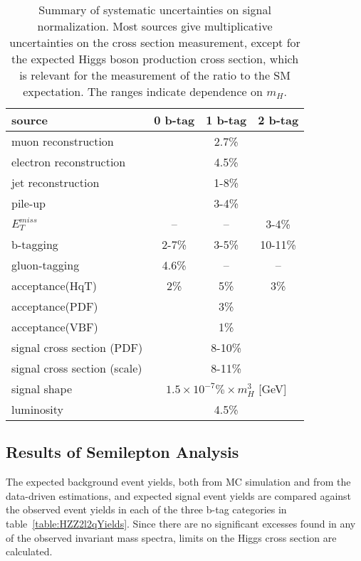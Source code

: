 \begin{table}
\begin{center}
\begin{tabular}{l|c|c|c}
\hline 
\hline

source & 0 b-tag & 1 b-tag & 2 b-tag \\ \hline \hline

muon reconstruction & \multicolumn{3}{c}{2.7\%} \\ \hline
electron reconstruction & \multicolumn{3}{c}{4.5\%} \\ \hline
jet reconstruction & \multicolumn{3}{c}{1-8\%} \\ \hline
pile-up & \multicolumn{3}{c}{3-4\%} \\ \hline
$E_T^{miss}$ & -- & -- & 3-4\% \\ \hline
b-tagging & 2-7\% & 3-5\% & 10-11\% \\ \hline
gluon-tagging & 4.6\% & -- & -- \\ \hline
acceptance(HqT) & 2\% & 5\% & 3\% \\ \hline
acceptance(PDF) & \multicolumn{3}{c}{3\%} \\ \hline
acceptance(VBF) & \multicolumn{3}{c}{1\%} \\ \hline
signal cross section (PDF) & \multicolumn{3}{c}{8-10\%} \\ \hline
signal cross section (scale) & \multicolumn{3}{c}{8-11\%} \\ \hline
signal shape    & \multicolumn{3}{c}{$1.5\times10^{-7}\%\times m_{H}^{3}$ [GeV]} \\ \hline
luminosity      & \multicolumn{3}{c}{4.5\%} \\ \hline \hline

\end{tabular}
\caption{Summary of systematic uncertainties on signal normalization.
Most sources give multiplicative uncertainties on the cross section
measurement, except for the expected Higgs boson production cross 
section, which is relevant for the measurement of the ratio to the 
SM expectation.  The ranges indicate dependence on $m_{H}$.}
\label{table:HZZ2l2qSystematics}
\end{center}
\end{table}

\subsection{Results of Semilepton Analysis}
\label{sec:HZZ2l2qxsec}

The expected background event yields, both from MC simulation and
from the data-driven estimations, and expected signal event yields
are compared against the observed event yields in each of the
three b-tag categories in table~\ref{table:HZZ2l2qYields}.
Since there are no significant excesses found in any of the
observed invariant mass spectra, limits on the Higgs cross section
are calculated.

